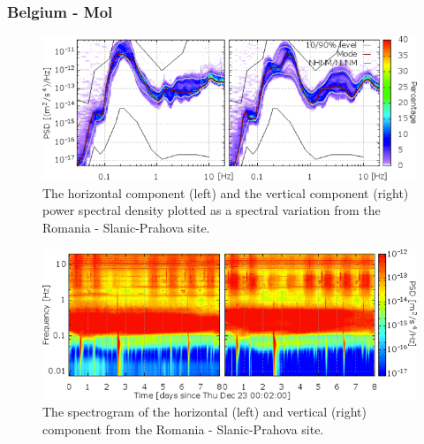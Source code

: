 \subsubsection*{Belgium - Mol}
\begin{figure}[h]
\centering
\includegraphics[width=\textwidth]{./Sec_SiteInfra/Figures/results/Mol-A_multiplot1}
\caption{The horizontal component (left) and the vertical component (right) power spectral density plotted as a spectral variation from the Romania - Slanic-Prahova site.}
\label{fig:Mol-A_multiplot1}
\end{figure}\begin{figure}[h]
\centering
\includegraphics[width=\textwidth]{./Sec_SiteInfra/Figures/results/Mol-A_multiplot2}
\caption{The spectrogram of the horizontal (left) and vertical (right) component from the Romania - Slanic-Prahova site.}
\label{fig:Mol-A_multiplot2}
\end{figure}
\FloatBarrier
